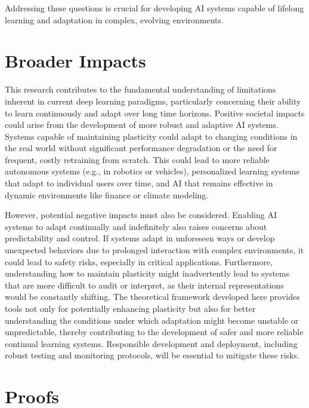 \documentclass{article}
\begin{document}
Addressing these questions is crucial for developing AI systems capable of lifelong learning and adaptation in complex, evolving environments.

\section{Broader Impacts}
This research contributes to the fundamental understanding of limitations inherent in current deep learning paradigms, particularly concerning their ability to learn continuously and adapt over long time horizons. Positive societal impacts could arise from the development of more robust and adaptive AI systems. Systems capable of maintaining plasticity could adapt to changing conditions in the real world without significant performance degradation or the need for frequent, costly retraining from scratch. This could lead to more reliable autonomous systems (e.g., in robotics or vehicles), personalized learning systems that adapt to individual users over time, and AI that remains effective in dynamic environments like finance or climate modeling.

However, potential negative impacts must also be considered. Enabling AI systems to adapt continually and indefinitely also raises concerns about predictability and control. If systems adapt in unforeseen ways or develop unexpected behaviors due to prolonged interaction with complex environments, it could lead to safety risks, especially in critical applications. Furthermore, understanding how to maintain plasticity might inadvertently lead to systems that are more difficult to audit or interpret, as their internal representations would be constantly shifting. The theoretical framework developed here provides tools not only for potentially enhancing plasticity but also for better understanding the conditions under which adaptation might become unstable or unpredictable, thereby contributing to the development of safer and more reliable continual learning systems. Responsible development and deployment, including robust testing and monitoring protocols, will be essential to mitigate these risks.



\appendix
\section{Proofs}
\label{app:proofs}
\end{document}
